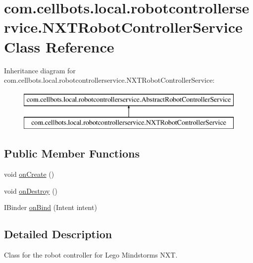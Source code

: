 \hypertarget{classcom_1_1cellbots_1_1local_1_1robotcontrollerservice_1_1_n_x_t_robot_controller_service}{\section{com.\-cellbots.\-local.\-robotcontrollerservice.\-N\-X\-T\-Robot\-Controller\-Service Class Reference}
\label{classcom_1_1cellbots_1_1local_1_1robotcontrollerservice_1_1_n_x_t_robot_controller_service}
}
Inheritance diagram for com.\-cellbots.\-local.\-robotcontrollerservice.\-N\-X\-T\-Robot\-Controller\-Service\-:\begin{figure}[H]
\begin{center}
\leavevmode
\includegraphics[height=2.000000cm]{classcom_1_1cellbots_1_1local_1_1robotcontrollerservice_1_1_n_x_t_robot_controller_service}
\end{center}
\end{figure}
\subsection*{Public Member Functions}
\begin{DoxyCompactItemize}
\item 
void \hyperlink{classcom_1_1cellbots_1_1local_1_1robotcontrollerservice_1_1_n_x_t_robot_controller_service_a92610180b3b948332f63ae35e890e441}{on\-Create} ()
\item 
void \hyperlink{classcom_1_1cellbots_1_1local_1_1robotcontrollerservice_1_1_n_x_t_robot_controller_service_aac1a6735474fcb30efb449c4fa5b77d5}{on\-Destroy} ()
\item 
I\-Binder \hyperlink{classcom_1_1cellbots_1_1local_1_1robotcontrollerservice_1_1_n_x_t_robot_controller_service_abcbdd1900ef90c1efd9f28b9f8fb28cc}{on\-Bind} (Intent intent)
\end{DoxyCompactItemize}


\subsection{Detailed Description}
Class for the robot controller for Lego Mindstorms N\-X\-T.

